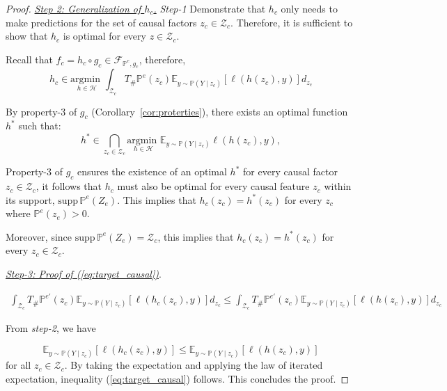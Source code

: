 \begin{proof}

\underline{\textit{Step 2: Generalization of $h_c$.}} \textit{Step-1} Demonstrate that \(h_c\) only needs to make predictions for the set of causal factors \(z_c \in \mathcal{Z}_c\). Therefore, it is sufficient to show that \(h_c\) is optimal for every \(z \in \mathcal{Z}_c\).


Recall that $f_c=h_c\circ g_c\in \mathcal{F}_{\mathbb{P}^e,g_c}$, 
therefore, 
$$h_c\in \underset{h\in \mathcal{H}}{\text{argmin }} \int_{\mathcal{Z}_c}T_{\#}\mathbb{P}^{e}(z_c)\mathbb{E}_{y\sim\mathbb{P}(Y\mid z_c)} \left[ \ell\left(h\left(z_c\right),y\right)\right]
 d_{z_c} $$

By property-3 of $g_c$ (Corollary~\ref{cor:proterties}), there exists an optimal function \(h^*\) such that:
\begin{equation*}
  h^* \in\bigcap_{z_c\in\mathcal{Z}_c} \underset{h\in \mathcal{H}}{\text{argmin }} \mathbb{E}_{y\sim\mathbb{P}(Y\mid z_c)} \ell\left ( h( z_c), y \right ),  
\end{equation*}


Property-3 of \(g_c\) ensures the existence of an optimal \(h^*\) for every causal factor \(z_c \in \mathcal{Z}_c\), it follows that \(h_c\) must also be optimal for every causal feature \(z_c\) within its support, \(\text{supp}\,\mathbb{P}^e(Z_e)\). This implies that \(h_c(z_c) = h^*(z_c)\) for every \(z_c\) where \(\mathbb{P}^e(z_e) > 0\).

Moreover, since \(\text{supp}\,\mathbb{P}^e(Z_e) = \mathcal{Z}_c\), this implies that \(h_c(z_c) = h^*(z_c)\) for every \(z_c \in \mathcal{Z}_c\).

\underline{\textit{Step-3: Proof of (\ref{eq:target_causal})}}.

\begin{align*}
\int_{\mathcal{Z}_c}T_{\#}\mathbb{P}^{e'}(z_c)\mathbb{E}_{y\sim\mathbb{P}(Y\mid z_c)} \left[ \ell\left(h_c\left(z_c\right),y\right)\right]
 d_{z_c}\leq\int_{\mathcal{Z}_c}T_{\#}\mathbb{P}^{e'}(z_c)\mathbb{E}_{y\sim\mathbb{P}(Y\mid z_c)} \left[ \ell\left(h\left(z_c\right),y\right)\right]
 d_{z_c}
\end{align*}

From \textit{step-2}, we have 

$$\mathbb{E}_{y\sim\mathbb{P}(Y\mid z_c)} \left[ \ell\left(h_c\left(z_c\right),y\right)\right]
\leq\mathbb{E}_{y\sim\mathbb{P}(Y\mid z_c)} \left[ \ell\left(h\left(z_c\right),y\right)\right]
$$
for all $z_c\in \mathcal{Z}_c$. By taking the expectation and applying the law of iterated expectation, inequality (\ref{eq:target_causal}) follows. This concludes the proof.


\end{proof}

